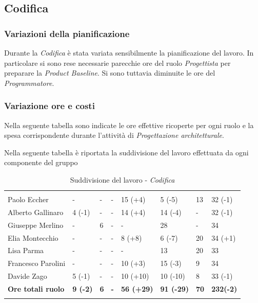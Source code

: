\subsection{Codifica}
\label{sec:ConsuntivoCodifica}
\subsubsection{Variazioni della pianificazione}
Durante la \textit{Codifica} è stata variata sensibilmente la pianificazione del lavoro. In particolare si sono rese necessarie parecchie ore del ruolo \textit{Progettista} per preparare la \textit{Product Baseline}. Si sono tuttavia diminuite le ore del \textit{Programmatore}.

\subsubsection{Variazione ore e costi}
Nella seguente tabella sono indicate le ore effettive ricoperte per ogni ruolo e la spesa corrispondente durante l'attività di \textit{Progettazione architetturale}.

Nella seguente tabella è riportata la suddivisione del lavoro effettuata da ogni componente del gruppo
\begin{table}[H]
	\centering
	\begin{tabular}{|C{4cm}|C{1cm}|C{1cm}|C{1cm}|C{1cm}|C{1cm}|C{1cm}|C{2.5cm}|}
		 & & &&&&&\\
		Paolo Eccher      & - & - & - & 15 (+4) & 5 (-5) & 13 & 32 (-1) \\
		\hline
		Alberto Gallinaro & 4 (-1) & - & - & 14 (+4) & 14 (-4) & - & 32 (-1) \\
		\hline
		Giuseppe Merlino  & - & 6 & - & - & 28 & - & 34 \\
		\hline
		Elia Montecchio   & - & - & - & 8 (+8) & 6 (-7) & 20 & 34 (+1) \\
		\hline
		Lisa Parma        & - & - & - & - & 13 & 20 & 33 \\
		\hline
		Francesco Parolini& - & - & - & 10 (+3) & 15 (-3) & 9 & 34 \\
		\hline
		Davide Zago       & 5 (-1) & - & - & 10 (+10) & 10 (-10) & 8 & 33 (-1) \\
		\hline
		\textbf{Ore totali ruolo}  & \textbf{9 (-2)} & \textbf{6} & \textbf{-} & \textbf{56 (+29)} & \textbf{91 (-29)} & \textbf{70} & \textbf{232(-2)} \\
	\end{tabular}
	\caption{Suddivisione del lavoro - \textit{Codifica}}
\end{table}


